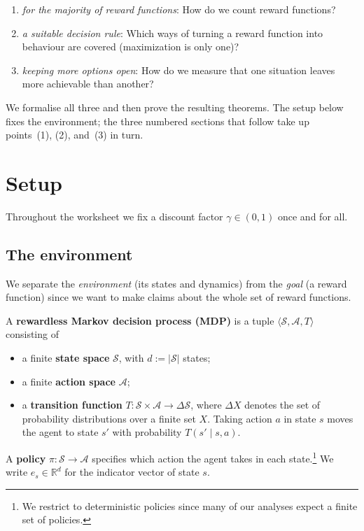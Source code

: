 \documentclass[11pt]{article}
\newcommand{\cS}{\mathcal{S}}
\newcommand{\cA}{\mathcal{A}}
\newcommand{\R}{\mathbb{R}}
\begin{document}
\begin{enumerate}
  \item \emph{for the majority of reward functions}: How do we count reward functions?
  \item \emph{a suitable decision rule}: Which ways of turning a
  reward function into behaviour are covered (maximization is only one)?
  \item \emph{keeping more options open}: How do we measure that one situation leaves more achievable than
  another?
\end{enumerate}

We formalise all three and then prove the resulting theorems. The setup below fixes the
environment; the three numbered sections that follow take up points~(1), (2), and~(3) in turn.



\section*{Setup}

Throughout the worksheet we fix a discount factor $\gamma \in (0,1)$ once and for all.

\subsection*{The environment}

We separate the \emph{environment} (its states and dynamics) from the \emph{goal} (a
reward function) since we want to make claims about the whole set of reward functions.

\begin{definition}\label{def:mdp}
A \textbf{rewardless Markov decision process (MDP)} is a tuple
$\langle \cS, \cA, T\rangle$ consisting of
\begin{itemize}\itemsep=2pt
  \item a finite \textbf{state space} $\cS$, with $d := |\cS|$ states;
  \item a finite \textbf{action space} $\cA$;
  \item a \textbf{transition function} $T : \cS \times \cA \to \Delta\cS$, where
  $\Delta X$ denotes the set of probability distributions over a finite set $X$. Taking
  action $a$ in state $s$ moves the agent to state $s'$ with probability
  $T(s' \mid s, a)$.
\end{itemize}
A \textbf{policy} $\pi : \cS \to \cA$ specifies which action the agent takes in each
state.\footnote{We restrict to deterministic policies since many of our analyses expect a finite set of policies.} We write
$e_s \in \R^{d}$ for the indicator vector of state $s$.
\end{definition}
\end{document}
